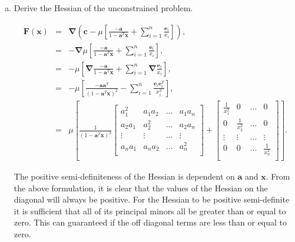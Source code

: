 \documentclass{article}
\begin{document}
\begin{enumerate}
\begin{enumerate}[a)]
	\item Derive the Hessian of the unconstrained problem.
	
	\begin{eqnarray*}
		\mathbf{F}(\mathbf{x}) &=& \boldsymbol{\nabla}\left(\mathbf{c} - \mu\left[\frac{-\mathbf{a}}{1 - \mathbf{a}^T \mathbf{x}} + \sum_{i=1}^n \frac{\mathbf{e}_i}{x_i}\right]\right), \\
		&=& -\boldsymbol{\nabla}\mu\left[\frac{-\mathbf{a}}{1 - \mathbf{a}^T \mathbf{x}} + \sum_{i=1}^n \frac{\mathbf{e}_i}{x_i}\right], \\
		&=& -\mu\left[\boldsymbol{\nabla}\frac{-\mathbf{a}}{1 - \mathbf{a}^T \mathbf{x}} + \sum_{i=1}^n \boldsymbol{\nabla}\frac{\mathbf{e}_i}{x_i}\right],\\
		&=& -\mu\left[\frac{-\mathbf{a}\mathbf{a}^T}{(1 - \mathbf{a}^T \mathbf{x})^2} - \sum_{i=1}^n \frac{\mathbf{e}_i\mathbf{e}_i^T}{x_i^2}\right], \\
		&=& \mu\left[\frac{1}{(1 - \mathbf{a}^T \mathbf{x})^2}\begin{bmatrix}
			a_1^2 & a_1 a_2 & ... & a_1 a_n \\
			a_2 a_1 & a_2^2 & ... & a_2 a_n \\
			\vdots & \vdots & ... & \vdots \\
			a_n a_1 & a_n a_2 & ... & a_n^2 \\
		\end{bmatrix} + \begin{bmatrix}
		\frac{1}{x_1^2} & 0 & ... & 0 \\
		0 & \frac{1}{x_2^2} & ... & 0 \\
		\vdots & \vdots & ... & \vdots \\
		0 & 0 & ... & \frac{1}{x_n^2} \\
	\end{bmatrix}\right].
	\end{eqnarray*}
	
	The positive semi-definiteness of the Hessian is dependent on $\mathbf{a}$ and $\mathbf{x}$.
	From the above formulation, it is clear that the values of the Hessian on the diagonal will always be positive.
	For the Hessian to be positive semi-definite it is sufficient that all of its principal minors all be greater than or equal to zero.
	This can guaranteed if the off diagonal terms are less than or equal to zero.
	
\end{enumerate}
	
\end{enumerate}
\end{document}
